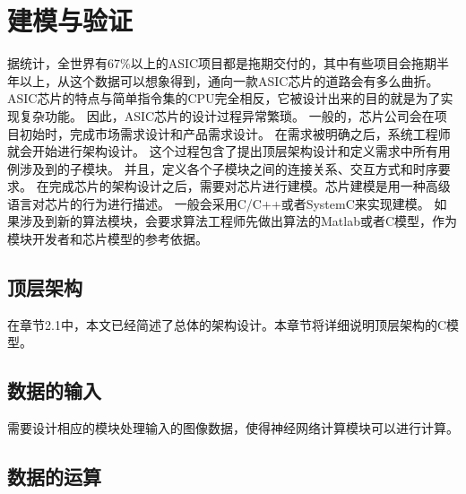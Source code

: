 
\chapter{建模与验证}

据统计，全世界有67\%以上的ASIC项目都是拖期交付的，其中有些项目会拖期半年以上，从这个数据可以想象得到，通向一款ASIC芯片的道路会有多么曲折。
ASIC芯片的特点与简单指令集的CPU完全相反，它被设计出来的目的就是为了实现复杂功能。
因此，ASIC芯片的设计过程异常繁琐。
一般的，芯片公司会在项目初始时，完成市场需求设计和产品需求设计。
在需求被明确之后，系统工程师就会开始进行架构设计。
这个过程包含了提出顶层架构设计和定义需求中所有用例涉及到的子模块。
并且，定义各个子模块之间的连接关系、交互方式和时序要求。
在完成芯片的架构设计之后，需要对芯片进行建模。芯片建模是用一种高级语言对芯片的行为进行描述。
一般会采用C/C++或者SystemC来实现建模。
如果涉及到新的算法模块，会要求算法工程师先做出算法的Matlab或者C模型，作为模块开发者和芯片模型的参考依据。

\section{顶层架构}
在章节2.1中，本文已经简述了总体的架构设计。本章节将详细说明顶层架构的C模型。


\section{数据的输入}
需要设计相应的模块处理输入的图像数据，使得神经网络计算模块可以进行计算。




\section{数据的运算}  

